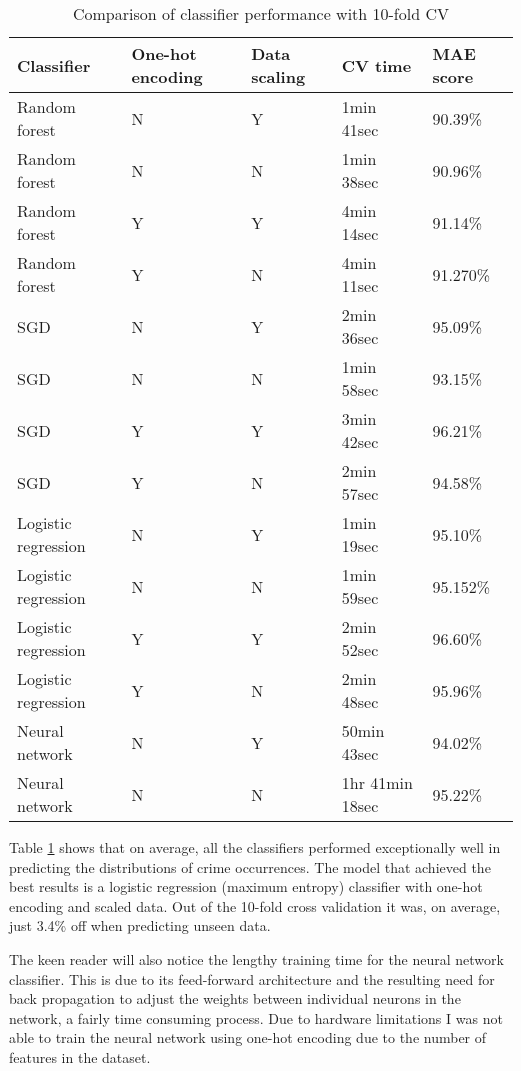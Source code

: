 \documentclass{article}
\begin{document}
	\begin{longtable}[m]{p{1.6cm}p{1.6cm}p{1.2cm}p{1.7cm}p{2cm}}
		\caption{Comparison of classifier performance with 10-fold CV}
		\label{fig:classifier-comparison} \\
		\hline
		{\bf Classifier} & {\bf One-hot encoding} & {\bf Data scaling} & {\bf CV time} & {\bf MAE score} \\ \hline
		\endhead
		Random forest & N & Y & 1min 41sec & 90.39\% \\ \hline
		Random forest & N & N & 1min 38sec & 90.96\% \\ \hline
		Random forest & Y & Y & 4min 14sec & 91.14\% \\ \hline
		Random forest & Y & N & 4min 11sec & 91.270\% \\ \hline
		
		SGD & N & Y & 2min 36sec & 95.09\% \\ \hline
		SGD & N & N & 1min 58sec & 93.15\% \\ \hline
		SGD & Y & Y & 3min 42sec & 96.21\% \\ \hline
		SGD & Y & N & 2min 57sec & 94.58\% \\ \hline
		
		Logistic regression & N & Y & 1min 19sec & 95.10\% \\ \hline
		Logistic regression & N & N & 1min 59sec & 95.152\% \\ \hline
		Logistic regression & Y & Y & 2min 52sec & 96.60\% \\ \hline
		Logistic regression & Y & N & 2min 48sec & 95.96\% \\ \hline
		
		Neural network & N & Y & 50min 43sec & 94.02\% \\ \hline
		Neural network & N & N & 1hr 41min 18sec & 95.22\% \\ \hline

	\end{longtable}

	Table \ref{fig:classifier-comparison} shows that on average, all the classifiers performed exceptionally well in predicting the distributions of crime occurrences. The model that achieved the best results is a logistic regression (maximum entropy) classifier with one-hot encoding and scaled data. Out of the 10-fold cross validation it was, on average, just 3.4\% off when predicting unseen data.
	
	The keen reader will also notice the lengthy training time for the neural network classifier. This is due to its feed-forward architecture and the resulting need for back propagation to adjust the weights between individual neurons in the network, a fairly time consuming process. Due to hardware limitations I was not able to train the neural network using one-hot encoding due to the number of features in the dataset.
\end{document}
